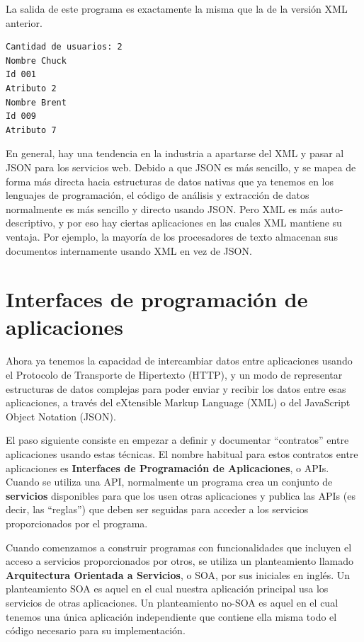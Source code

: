 La salida de este programa es exactamente la misma que la de la versión XML anterior.

\beforeverb
\begin{verbatim}
Cantidad de usuarios: 2
Nombre Chuck
Id 001
Atributo 2
Nombre Brent
Id 009
Atributo 7
\end{verbatim}
\afterverb
%
En general, hay una tendencia en la industria a apartarse del XML y pasar al JSON para
los servicios web. Debido a que JSON es más sencillo, y se mapea de forma más directa hacia
estructuras de datos nativas que ya tenemos en los lenguajes de programación, el código de
análisis y extracción de datos normalmente es más sencillo y directo usando JSON.
Pero XML es más auto-descriptivo, y por eso hay ciertas
aplicaciones en las cuales XML mantiene su ventaja. Por ejemplo, la mayoría de los
procesadores de texto almacenan sus documentos internamente usando XML en vez de JSON.

\section{Interfaces de programación de aplicaciones}

Ahora ya tenemos la capacidad de intercambiar datos entre aplicaciones usando el Protocolo
de Transporte de Hipertexto (HTTP), y un modo de representar estructuras de datos complejas
para poder enviar y recibir los datos entre esas aplicaciones, a través del eXtensible 
Markup Language (XML) o del JavaScript Object Notation (JSON).

El paso siguiente consiste en empezar a definir y documentar ``contratos'' entre
aplicaciones usando estas técnicas. El nombre habitual para estos
contratos entre aplicaciones es {\bf Interfaces de Programación
de Aplicaciones}, o APIs. Cuando se utiliza una API, normalmente un programa
crea un conjunto de {\bf servicios} disponibles para que los usen otras aplicaciones
y publica las APIs (es decir, las ``reglas'') que deben ser seguidas para
acceder a los servicios proporcionados por el programa.

Cuando comenzamos a construir programas con funcionalidades que incluyen
el acceso a servicios proporcionados por otros,
se utiliza un planteamiento llamado {\bf Arquitectura Orientada a Servicios}, o SOA, por sus
iniciales en inglés.
Un planteamiento SOA es aquel en el cual nuestra aplicación principal usa los servicios
de otras aplicaciones. Un planteamiento no-SOA es aquel en el cual tenemos
una única aplicación independiente que contiene ella misma todo el código
necesario para su implementación.

